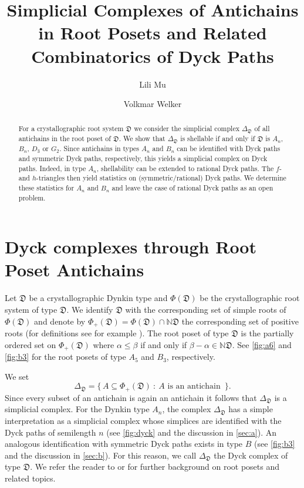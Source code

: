 \documentclass[11pt]{amsart}
\title[Simplicial Complexes of Antichains and Combinatorics of Dyck Paths]{Simplicial Complexes of Antichains in Root Posets and Related Combinatorics of Dyck Paths}
\author{Lili Mu}
\author{Volkmar Welker}
\def\NN{\mathbb{N}}
\def\fD{\mathfrak{D}}
\theoremstyle{plain}
\numberwithin{lemma}{\DefaultNumberTheoremWithin}
\numberwithin{theorem}{\DefaultNumberTheoremWithin}
\numberwithin{corollary}{\DefaultNumberTheoremWithin}
\numberwithin{proposition}{\DefaultNumberTheoremWithin}
\numberwithin{conjecture}{\DefaultNumberTheoremWithin}
\theoremstyle{definition}
\numberwithin{definition}{\DefaultNumberTheoremWithin}
\numberwithin{question}{\DefaultNumberTheoremWithin}
\numberwithin{problem}{\DefaultNumberTheoremWithin}
\theoremstyle{remark}
\numberwithin{remark}{\DefaultNumberTheoremWithin}
\numberwithin{example}{\DefaultNumberTheoremWithin}
\numberwithin{claim}{\DefaultNumberTheoremWithin}
\begin{document}
\begin{abstract}
For a crystallographic root system $\fD$ we consider the simplicial complex $\Delta_{\fD}$ of all antichains in the
root poset of $\fD$. We show that $\Delta_{\fD}$ is shellable if
and only if $\fD$ is $A_n$, $B_n$, $D_3$ or $G_2$. 
Since antichains in types $A_n$ and $B_n$ can be identified with 
Dyck paths and symmetric Dyck paths, respectively, this yields a simplicial complex on Dyck paths. Indeed, in type $A_n$, shellability can be extended to rational Dyck paths. The $f$- and $h$-triangles then 
yield statistics on (symmetric/rational) Dyck paths. We determine these statistics for $A_n$ and $B_n$ and leave the case of rational Dyck paths as an open problem.
\end{abstract}

\maketitle

\section{Dyck complexes through Root Poset Antichains}


Let $\fD$ be a crystallographic Dynkin type and $\Phi(\fD)$ be the crystallographic root system of type $\fD$. 
We identify $\fD$ with the corresponding set of simple roots of
$\Phi(\fD)$ and denote by
$\Phi_+(\fD) = \Phi(\fD)
\cap \NN \fD$
the corresponding set of positive roots (for definitions see for example \cite{BB05}).
The root poset of type $\fD$ is the partially ordered set on 
$\Phi_+(\fD)$ where $\alpha \leq \beta$ if and only if
$\beta - \alpha \in \NN \fD$. See \ref{fig:a6} and \ref{fig:b3} for the
root posets of type $A_5$ and $B_3$, respectively. 

We set $$\Delta_\fD = \{\, A \subseteq \Phi_+(\fD)~:~A \text{ is an antichain } \,\}.$$
Since every subset of an antichain is again an antichain it follows that
$\Delta_\fD$ is a simplicial complex. For the Dynkin type $A_n$, the complex
$\Delta_\fD$ has a simple interpretation as a simplicial complex whose simplices are identified with the Dyck paths of semilength $n$ (see \ref{fig:dyck} and the discussion in \ref{sec:a}). An analogous identification with symmetric Dyck paths exists in type
$B$ (see \ref{fig:b3} and the discussion in \ref{sec:b}). For this reason, we call $\Delta_\fD$ the Dyck complex of 
type $\fD$. 
We refer the reader to \cite{Arm09} or \cite{Rin16} for further background on root posets and related topics.
\end{document}
